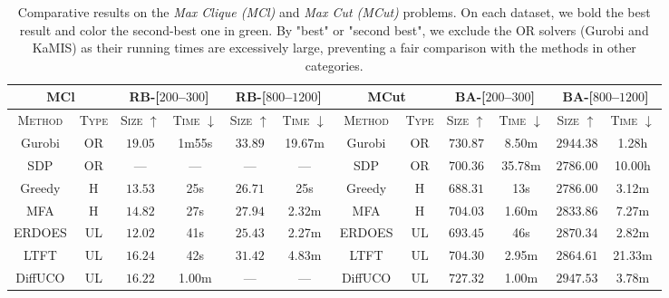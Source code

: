 \begin{table*}[ht!]
\small
    \centering
        
    \caption{Comparative results on the \textit{Max Clique (MCl)} and \textit{Max Cut (MCut)} problems. On each dataset, we bold the best result and color the second-best one in green. By "best" or "second best", we exclude the OR solvers (Gurobi and KaMIS) as their running times are excessively large, preventing a fair comparison with the methods in other categories. } %
        \vspace{5pt}
    \begin{tabular}{cc|cccc|cc|cccc}

       \multicolumn{2}{c}{\textbf{MCl}} &  \multicolumn{2}{c}{RB-[$200$--$300$]} & \multicolumn{2}{c}{RB-[$800$--$1200$]} &      
       \multicolumn{2}{c}{\textbf{MCut}} &  \multicolumn{2}{c}{BA-[$200$--$300$]} & \multicolumn{2}{c}{BA-[$800$--$1200$]}    \\
           \toprule   %
       \textsc{Method}  &       \textsc{Type}     & \textsc{Size} $\uparrow$  & \textsc{Time} $\downarrow$  & \textsc{Size} $\uparrow$  & \textsc{Time} $\downarrow$ &\textsc{Method}  &       \textsc{Type}     & \textsc{Size} $\uparrow$  & \textsc{Time} $\downarrow$  & \textsc{Size} $\uparrow$  & \textsc{Time} $\downarrow$   \\
    \midrule
    Gurobi & OR & $19.05$ & 1m55s & $33.89$ & 19.67m & Gurobi & OR & $730.87$ & 8.50m & $2944.38$ & 1.28h \\
    SDP & OR &  --- & --- & --- & --- & SDP & OR & $700.36$  & 35.78m & $2786.00$ & 10.00h \\
    \midrule
    Greedy & H & $13.53$ & 25s & $26.71$ & 25s  & Greedy & H & $688.31$ & 13s & $2786.00$ & 3.12m \\
    MFA    & H & $14.82$ & 27s & $27.94$ & 2.32m & MFA & H & $704.03$ & 1.60m & $2833.86$ & 7.27m \\
    ERDOES & UL & $12.02$ & 41s & $25.43$ & 2.27m & ERDOES & UL & $693.45$ & 46s & $2870.34$ & 2.82m \\
    LTFT &  UL & $16.24$ & 42s & $31.42$ & 4.83m & LTFT & UL & $704.30$ & 2.95m & $2864.61$ & 21.33m \\
    DiffUCO & UL & $16.22$ & 1.00m & --- & --- & DiffUCO & UL & $727.32$ & 1.00m & \textcolor{mygreen}{$2947.53$} & 3.78m \\

\end{tabular}
\end{table*}
